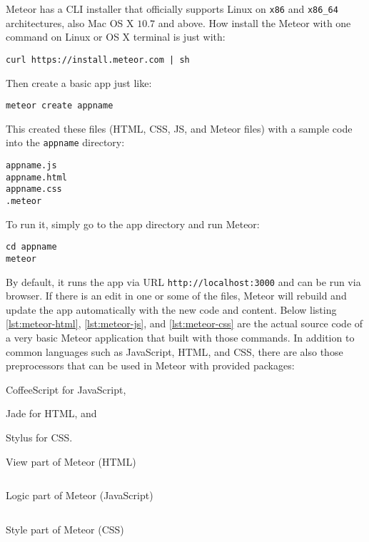 Meteor has a \ac{CLI} installer that officially supports Linux on \verb|x86| and \verb|x86_64| architectures, also Mac OS X $10.7$ and above.
How install the Meteor with one command on Linux or OS X terminal is just with:

\begin{verbatim}
curl https://install.meteor.com | sh
\end{verbatim}

\noindent Then create a basic app just like:

\begin{verbatim}
meteor create appname
\end{verbatim}

This created these files (\ac{HTML}, \ac{CSS}, \ac{JS}, and Meteor files) with a sample code into the \verb|appname| directory:

\begin{verbatim}
appname.js
appname.html
appname.css
.meteor
\end{verbatim}

To run it, simply go to the app directory and run Meteor:

\begin{verbatim}
cd appname
meteor
\end{verbatim}

By default, it runs the app via \ac{URL} \verb|http://localhost:3000| and can be run via browser.
If there is an edit in one or some of the files, Meteor will rebuild and update the app automatically with the new code and content.
\noindent Below listing \autoref{lst:meteor-html}, \autoref{lst:meteor-js}, and \autoref{lst:meteor-css} are the actual source code of a very basic Meteor application that built with those commands.
In addition to common languages such as JavaScript, \ac{HTML}, and \ac{CSS}, there are also those preprocessors that can be used in Meteor with provided packages:
\begin{inparaenum}[\itshape 1\upshape)]
\item CoffeeScript for JavaScript,
\item Jade for \ac{HTML}, and
\item Stylus for \ac{CSS}.
\end{inparaenum}

\begin{listing}[htp]
\caption{View part of Meteor (HTML)}
\inputminted{html}{\dir/include/meteor/meteor.html}
\label{lst:meteor-html}
\end{listing}

\begin{listing}[htp]
\caption{Logic part of Meteor (JavaScript)}
\inputminted{javascript}{\dir/include/meteor/meteor.js}
\label{lst:meteor-js}
\end{listing}

\begin{listing}[htp]
\caption{Style part of Meteor (CSS)}
\inputminted{css}{\dir/include/meteor/meteor.css}
\label{lst:meteor-css}
\end{listing}
